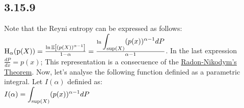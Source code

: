 \documentclass{exam}
\begin{document}
\subsection*{3.15.9}
Note that the Reyni entropy can be expressed as follows: \ $\text{H}_\alpha(\text{p}(X)) = \frac{\ln \mathbb{E} \left[(p(X))^{\alpha-1}\right]}{1 - \alpha} = \frac{\ln\displaystyle\int_{\tiny \text{sup}(X)}(p(x))^{\alpha-1} d P}{\alpha - 1}$. In the last expression $\frac{d P}{d x} = p(x)$; This representation is a consecuence of the \href{https://en.wikipedia.org/wiki/Radon%E2%80%93Nikodym_theorem}{Radon-Nikodym's Theorem}. Now, let's analyse the following function definied as a parametric integral. Let $I(\alpha)$ definied as:\\
$I(\alpha) = \displaystyle\int_{\tiny \text{sup}(X)}(p(x))^{\alpha-1} d P$\newline 
\end{document}
